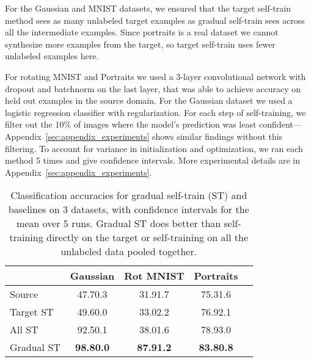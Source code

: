 \documentclass[11pt]{article}
\newcommand{\pl}[1]{}
\newcommand{\ak}[1]{}
\begin{document}
For the Gaussian and MNIST datasets, we ensured that the target self-train method sees as many unlabeled target examples as gradual self-train sees across all the intermediate examples.
Since portraits is a real dataset we cannot synthesize more examples from the target, so target self-train uses fewer unlabeled examples here. 

For rotating MNIST and Portraits we used a 3-layer convolutional network with dropout and batchnorm on the last layer, that was able to achieve  accuracy on held out examples in the source domain.
For the Gaussian dataset we used a logistic regression classifier with  regularization.
For each step of self-training, we filter out the 10\% of images where the model's prediction was least confident---Appendix~\ref{sec:appendix_experiments} shows similar findings without this filtering\pl{then why bother with this filtering since it's more complicated?}\ak{all methods do better with this filtering, but the relative difference is similar, see appendix C}.
To account for variance in initialization and optimization, we ran each method 5 times and give  confidence intervals.
More experimental details are in Appendix~\ref{sec:appendix_experiments}.

\begin{table}[t]
\caption{
Classification accuracies for gradual self-train (ST) and baselines on 3 datasets, with  confidence intervals for the mean over 5 runs.
Gradual ST does better than self-training directly on the target or self-training on all the unlabeled data pooled together.
}
\label{tab:gradHelps}
\vskip 0.15in
\begin{center}
\begin{small}
\begin{sc}
\begin{tabular}{lcccr}
\toprule
 & Gaussian & Rot MNIST & Portraits \\
\midrule
Source              & 47.70.3  & 31.91.7 & 75.31.6 \\
Target ST   & 49.60.0  & 33.02.2 & 76.92.1 \\
All ST     & 92.50.1  & 38.01.6 & 78.93.0 \\
Gradual ST & \textbf{98.80.0} & \textbf{87.91.2} & \textbf{83.80.8} \\
\bottomrule
\end{tabular}
\end{sc}
\end{small}
\end{center}
\vskip -0.1in
\end{table}
\end{document}
